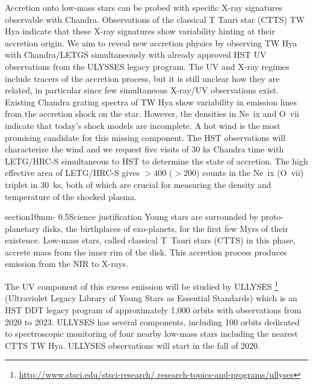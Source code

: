 \documentclass[letterpaper,11pt,twocolumn]{article}
\makeatletter
\renewcommand{\section}{\@startsection%
{section}{1}{0mm}{-\baselineskip}%
{0.5\baselineskip}{\normalfont\Large\bfseries}}%
\makeatother
\begin{document}

Accretion onto low-mass stars can be probed with specific X-ray
signatures observable with Chandra. Observations of the
classical T Tauri star (CTTS) TW Hya indicate that these X-ray
signatures show variability hinting at their accretion origin. We aim
to reveal new accretion physics by observing TW Hya with Chandra/LETGS
simultaneously with already approved HST UV observations from the ULYSSES
legacy program.
The UV and X-ray regimes include tracers of the
accretion process, but it is still unclear how they are related, in
particular since few simultaneous X-ray/UV observations
exist. Existing Chandra grating spectra of TW Hya show variability in emission
lines from the accretion shock on the star. However, the densities in
Ne~{\sc ix} and O~{\sc vii} indicate that today's shock models are
incomplete. A hot wind is the most promising candidate for this
missing component. The HST observations will characterize the wind and
we request five visits of 30 ks Chandra time with LETG/HRC-S
simultaneous to HST to determine the state of accretion. The high
effective area of LETG/HRC-S gives $> 400$ ($>200$) counts in the Ne~{\sc ix} (O~{\sc vii}) triplet in 30~ks, both of which are
crucial for measuring the density and temperature of the shocked plasma.


\section{Science justification}
Young stars are surrounded by proto-planetary disks, the birthplaces of exo-planets, for the first few Myrs of their existence. Low-mass stars, called classical T~Tauri stars (CTTS) in this phase, accrete mass from the inner rim of the disk. This accretion process produces emission from the NIR to X-rays.

The UV component of this excess emission will be studied by ULLYSES 
\footnote{\url{http://www.stsci.edu/stsci-research/ research-topics-and-programs/ullyses}}
(Ultraviolet Legacy Library of Young Stars as Essential Standards) which is an HST DDT legacy program of  approximately 1,000 orbits with observations from 2020 to 2023. ULLYSES has several components, including 100 orbits dedicated to spectroscopic monitoring of four nearby low-mass stars including the nearest CTTS TW Hya. ULLYSES observations will start in the fall of 2020.
\end{document}
